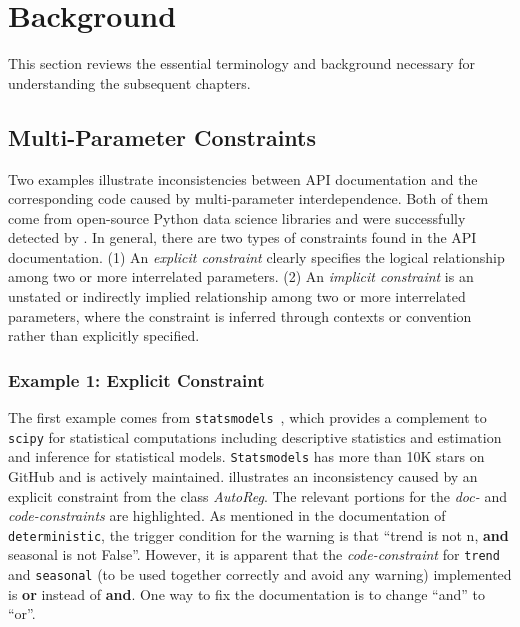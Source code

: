 \section{Background}\label{sec:bg-mpchecker}
This section reviews the essential terminology and background necessary for understanding the subsequent chapters.
\subsection{Multi-Parameter Constraints}\label{sec:eg-mpchecker}
Two examples illustrate inconsistencies between API documentation and the corresponding code
caused by multi-parameter interdependence.
Both of them come from open-source Python data science libraries and were successfully
detected by \toolchecker.
In general, there are two types of constraints found in the API documentation.
(1) An \emph{explicit constraint} clearly specifies the logical relationship among two or more
interrelated parameters.
(2) An \emph{implicit constraint} is an unstated or indirectly implied relationship among two or
more interrelated parameters, where the constraint is inferred through contexts or convention
rather than explicitly specified.


\subsubsection{Example 1: Explicit Constraint}\label{sec:eg1-mpchecker}

The first example comes from \texttt{statsmodels}~\cite{github:statsmodels}, which provides a
complement to \texttt{scipy} for statistical computations including descriptive statistics and
estimation and inference for statistical models.
\texttt{Statsmodels} has more than 10K stars on GitHub and is actively maintained.
 illustrates an inconsistency caused by an explicit constraint from the class
\textit{AutoReg}.
The relevant portions for the \emph{doc-} and \emph{code-constraints} are highlighted.
As mentioned in the documentation of \texttt{deterministic}, the trigger condition for the warning
is that ``trend is not n, \textbf{and} seasonal is not False''.
However, it is apparent that the \emph{code-constraint} for \texttt{trend} and \texttt{seasonal} (to be
used together correctly and avoid any warning) implemented is \textbf{or} instead of \textbf{and}.
One way to fix the documentation is to change ``and'' to ``or''.


